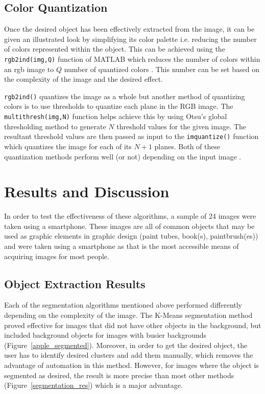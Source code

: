 \documentclass{article}
\begin{document}
\subsection{Color Quantization}
\label{sec:quantization}
Once the desired object has been effectively extracted from the image, it can be given an illustrated look by simplifying its color palette i.e. reducing the number of colors represented within the object. This can be achieved using the \texttt{rgb2ind(img,Q)} function of MATLAB which reduces the number of colors within an rgb image to $Q$ number of quantized colors \cite{noauthor_convert_nodate}. This number can be set based on the complexity of the image and the desired effect. 

\texttt{rgb2ind()} quantizes the image as a whole but another method of quantizing colors is to use thresholds to quantize each plane in the RGB image. The \texttt{multithresh(img,N)} function helps achieve this by using Otsu's global thresholding method to generate $N$ threshold values for the given image. The resultant threshold values are then passed as input to the \texttt{imquantize()} function which quantizes the image for each of its $N+1$ planes. Both of these quantization methods perform well (or not) depending on the input image \cite{noauthor_multilevel_nodate,noauthor_quantize_nodate}. 



\section{Results and Discussion}
\label{sec:results}
In order to test the effectiveness of these algorithms, a sample of 24 images were taken using a smartphone. These images are all of common objects that may be used as graphic elements in graphic design (paint tubes, book(s), paintbrush(es)) and were taken using a smartphone as that is the most accessible means of acquiring images for most people. 

\subsection{Object Extraction Results}
\label{sec:extraction_results}
Each of the segmentation algorithms mentioned above performed differently depending on the complexity of the image. The K-Means segmentation method proved effective for images that did not have other objects in the background, but included background objects for images with busier backgrounds (Figure~\ref{apple_segmented}). Moreover, in order to get the desired object, the user has to identify desired clusters and add them manually, which removes the advantage of automation in this method. However, for images where the object is segmented as desired, the result is more precise than most other methods (Figure~\ref{segmentation_res}) which is a major advantage.
\end{document}
